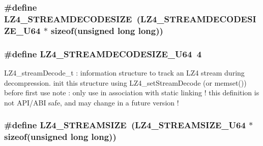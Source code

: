 \subsubsection[{L\+Z4\+\_\+\+S\+T\+R\+E\+A\+M\+D\+E\+C\+O\+D\+E\+S\+I\+Z\+E}]{\setlength{\rightskip}{0pt plus 5cm}\#define L\+Z4\+\_\+\+S\+T\+R\+E\+A\+M\+D\+E\+C\+O\+D\+E\+S\+I\+Z\+E~({\bf L\+Z4\+\_\+\+S\+T\+R\+E\+A\+M\+D\+E\+C\+O\+D\+E\+S\+I\+Z\+E\+\_\+\+U64} $\ast$ sizeof(unsigned long long))}\label{compat-lz4_8h_a9a08f1c4969b5e46eba93818cd7cb5a7}
\hypertarget{compat-lz4_8h_a414ecb38e0607f239de5ebca5a5beef5}{}
\subsubsection[{L\+Z4\+\_\+\+S\+T\+R\+E\+A\+M\+D\+E\+C\+O\+D\+E\+S\+I\+Z\+E\+\_\+\+U64}]{\setlength{\rightskip}{0pt plus 5cm}\#define L\+Z4\+\_\+\+S\+T\+R\+E\+A\+M\+D\+E\+C\+O\+D\+E\+S\+I\+Z\+E\+\_\+\+U64~4}\label{compat-lz4_8h_a414ecb38e0607f239de5ebca5a5beef5}
L\+Z4\+\_\+stream\+Decode\+\_\+t \+: information structure to track an L\+Z4 stream during decompression. init this structure using L\+Z4\+\_\+set\+Stream\+Decode (or memset()) before first use note \+: only use in association with static linking ! this definition is not A\+P\+I/\+A\+B\+I safe, and may change in a future version ! \hypertarget{compat-lz4_8h_a1b76402ebadac569ceb550cb22a7a6e4}{}
\subsubsection[{L\+Z4\+\_\+\+S\+T\+R\+E\+A\+M\+S\+I\+Z\+E}]{\setlength{\rightskip}{0pt plus 5cm}\#define L\+Z4\+\_\+\+S\+T\+R\+E\+A\+M\+S\+I\+Z\+E~({\bf L\+Z4\+\_\+\+S\+T\+R\+E\+A\+M\+S\+I\+Z\+E\+\_\+\+U64} $\ast$ sizeof(unsigned long long))}\label{compat-lz4_8h_a1b76402ebadac569ceb550cb22a7a6e4}
\hypertarget{compat-lz4_8h_acddbce79f3e1d413f295e97d986ab3f5}{}
